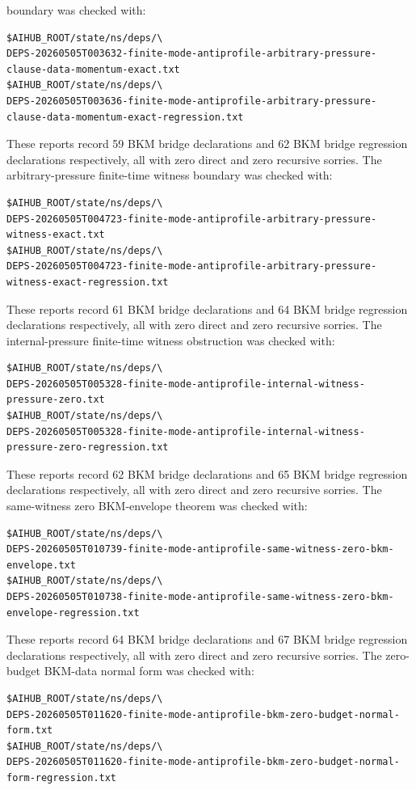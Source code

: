 \documentclass[11pt]{article}
\begin{document}
boundary was checked with:
\begin{verbatim}
$AIHUB_ROOT/state/ns/deps/\
DEPS-20260505T003632-finite-mode-antiprofile-arbitrary-pressure-clause-data-momentum-exact.txt
$AIHUB_ROOT/state/ns/deps/\
DEPS-20260505T003636-finite-mode-antiprofile-arbitrary-pressure-clause-data-momentum-exact-regression.txt
\end{verbatim}
These reports record 59 BKM bridge declarations and 62 BKM bridge regression
declarations respectively, all with zero direct and zero recursive sorries.
The arbitrary-pressure finite-time witness boundary was checked with:
\begin{verbatim}
$AIHUB_ROOT/state/ns/deps/\
DEPS-20260505T004723-finite-mode-antiprofile-arbitrary-pressure-witness-exact.txt
$AIHUB_ROOT/state/ns/deps/\
DEPS-20260505T004723-finite-mode-antiprofile-arbitrary-pressure-witness-exact-regression.txt
\end{verbatim}
These reports record 61 BKM bridge declarations and 64 BKM bridge regression
declarations respectively, all with zero direct and zero recursive sorries.
The internal-pressure finite-time witness obstruction was checked with:
\begin{verbatim}
$AIHUB_ROOT/state/ns/deps/\
DEPS-20260505T005328-finite-mode-antiprofile-internal-witness-pressure-zero.txt
$AIHUB_ROOT/state/ns/deps/\
DEPS-20260505T005328-finite-mode-antiprofile-internal-witness-pressure-zero-regression.txt
\end{verbatim}
These reports record 62 BKM bridge declarations and 65 BKM bridge regression
declarations respectively, all with zero direct and zero recursive sorries.
The same-witness zero BKM-envelope theorem was checked with:
\begin{verbatim}
$AIHUB_ROOT/state/ns/deps/\
DEPS-20260505T010739-finite-mode-antiprofile-same-witness-zero-bkm-envelope.txt
$AIHUB_ROOT/state/ns/deps/\
DEPS-20260505T010738-finite-mode-antiprofile-same-witness-zero-bkm-envelope-regression.txt
\end{verbatim}
These reports record 64 BKM bridge declarations and 67 BKM bridge regression
declarations respectively, all with zero direct and zero recursive sorries.
The zero-budget BKM-data normal form was checked with:
\begin{verbatim}
$AIHUB_ROOT/state/ns/deps/\
DEPS-20260505T011620-finite-mode-antiprofile-bkm-zero-budget-normal-form.txt
$AIHUB_ROOT/state/ns/deps/\
DEPS-20260505T011620-finite-mode-antiprofile-bkm-zero-budget-normal-form-regression.txt
\end{verbatim}
\end{document}
